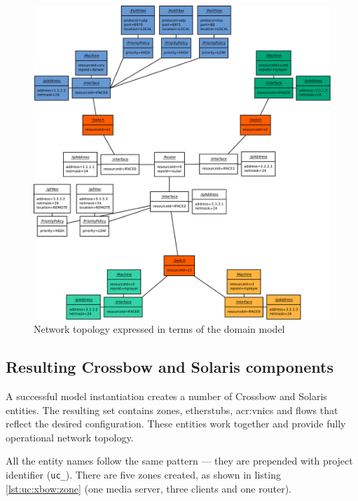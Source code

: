 \documentclass[11pt,openany]{book}
\begin{document}
        \begin{figure}[H]
          \centering
          \includegraphics[width=.9\textwidth]{img/test-case/topology-om.pdf}

          \caption{Network topology expressed in terms of the domain model}
          \label{fig:cs:topo}
        \end{figure}
      
      
      \subsection{Resulting Crossbow and Solaris components}
      \label{sub:uc:xbow}

        A successful model instantiation creates a number of Crossbow and Solaris entities. The resulting set contains
        zones, etherstubs, \gls{acr:vnic}s and flows that reflect the desired configuration. These entities work together and
        provide fully operational network topology.

        All the entity names follow the same pattern --- they are prepended with project identifier (\texttt{uc\_}).
        There are five zones created, as shown in listing \ref{lst:uc:xbow:zone} (one media server, three clients and
        one router). \\

        \noindent
        \begin{minipage}{\textwidth}
          
        \end{minipage}
\end{document}
